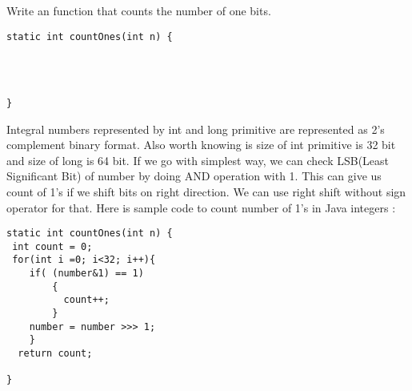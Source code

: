 \question Write an function that counts the number of one bits.

\ifprintanswers\else
\begin{lstlisting}
static int countOnes(int n) {
    
    
    
    
}
\end{lstlisting}
\fi

\begin{solution}
Integral numbers represented by int and long primitive are represented as 2's complement binary format. Also worth knowing is size of int primitive is 32 bit and size of long is 64 bit. If we go with simplest way, we can check LSB(Least Significant Bit) of number by doing AND operation with 1. This can give us count of 1's if we shift bits on right direction. We can use right shift without sign operator for that. Here is sample code to count number of 1's in Java integers :


\begin{lstlisting}
static int countOnes(int n) {
 int count = 0; 
 for(int i =0; i<32; i++){ 
    if( (number&1) == 1) 
        { 
          count++; 
        } 
    number = number >>> 1; 
    } 
  return count; 

}
\end{lstlisting}
\end{solution}